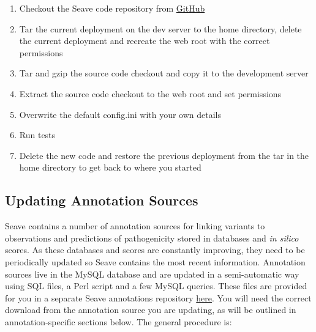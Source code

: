\documentclass[11pt, a4paper]{article}
\begin{document}
\begin{enumerate}
\item Checkout the Seave code repository from \href{https://github.com/KCCG/seave}{GitHub}
\item Tar the current deployment on the dev server to the home directory, delete the current deployment and recreate the web root with the correct permissions
\item Tar and gzip the source code checkout and copy it to the development server 
\item Extract the source code checkout to the web root and set permissions
\item Overwrite the default config.ini with your own details
\item Run tests
\item Delete the new code and restore the previous deployment from the tar in the home directory to get back to where you started
\end{enumerate}


\subsection{Updating Annotation Sources}\label{updateAnnotations}

Seave contains a number of annotation sources for linking variants to observations and predictions of pathogenicity stored in databases and \textit{in silico} scores. As these databases and scores are constantly improving, they need to be periodically updated so Seave contains the most recent information. Annotation sources live in the MySQL database and are updated in a semi-automatic way using SQL files, a Perl script and a few MySQL queries. These files are provided for you in a separate Seave annotations repository \href{https://github.com/KCCG/seave-databases-annotations}{here}. You will need the correct download from the annotation source you are updating, as will be outlined in annotation-specific sections below. The general procedure is:
\end{document}

